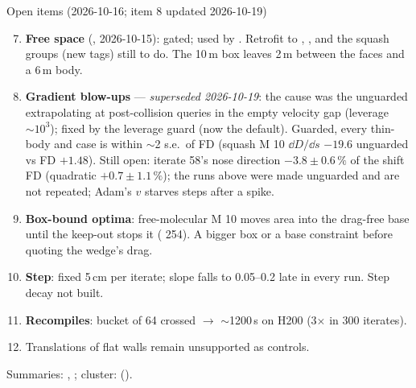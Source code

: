 \documentclass[10pt,aspectratio=169]{beamer}
\begin{document}
\begin{frame}{Open items (2026-10-16; item 8 updated 2026-10-19)}
\footnotesize
\begin{enumerate}\setcounter{enumi}{6}
\item \textbf{Free space} (, 2026-10-15): gated; used by .  Retrofit to , ,
   and the squash groups (new tags) still to do.  The 10\,m box leaves 2\,m between the faces and a 6\,m body.
\item \textbf{Gradient blow-ups} --- \emph{superseded 2026-10-19}: the cause was the unguarded  extrapolating at
  post-collision queries in the empty velocity gap (leverage $\sim10^3$); fixed by the leverage guard 
  (now the default).  Guarded, every thin-body and  case is within $\sim$2 s.e.\ of FD (squash M 10 $\dd D/\dd s$
  $-19.6$ unguarded vs FD $+1.48$).  Still open:  iterate 58's nose direction $-3.8\pm0.6\,\%$ of the shift FD
  (quadratic $+0.7\pm1.1\,\%$); the  runs above were made unguarded and are not repeated; Adam's $v$ starves steps after a spike.
\item \textbf{Box-bound optima}: free-molecular M 10 moves area into the drag-free base until the keep-out stops it ( 254).
  A bigger box or a base constraint before quoting the wedge's drag.
\item \textbf{Step}: fixed 5\,cm per iterate; slope falls to 0.05--0.2 late in every run.  Step decay not built.
\item \textbf{Recompiles}:  bucket of 64 crossed $\to$ $\sim$1200\,s on H200 (3$\times$ in 300 iterates).
\item Translations of flat walls remain unsupported as controls.
\end{enumerate}
\medskip
Summaries: , ; cluster:
 ().
\end{frame}
\end{document}
